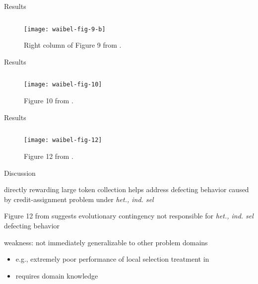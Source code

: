 \begin{frame}{Results}

\begin{figure}
\begin{columns}
\begin{column}{0.7\textwidth}
\texttt{[image: waibel-fig-9-b]}
\end{column}
\begin{column}{0.3\textwidth}
\caption{
Right column of Figure 9 from \cite{waibel2009genetic}.
}
\end{column}
\end{columns}
\end{figure}

\end{frame}

\begin{frame}{Results}


\begin{figure}
\begin{columns}
\begin{column}{0.7\textwidth}
\texttt{[image: waibel-fig-10]}
\end{column}
\begin{column}{0.3\textwidth}
\caption{
Figure 10 from \cite{waibel2009genetic}.
}
\end{column}
\end{columns}
\end{figure}

\end{frame}

\begin{frame}{Results}

\begin{figure}
\begin{columns}
\begin{column}{0.8\textwidth}
\texttt{[image: waibel-fig-12]}
\end{column}
\begin{column}{0.2\textwidth}
\caption{
Figure 12 from \cite{waibel2009genetic}.
}
\end{column}
\end{columns}
\end{figure}

\end{frame}

\begin{frame}{Discussion}

directly rewarding large token collection helps address defecting behavior caused by credit-assignment problem under \textit{het., ind. sel}

Figure 12 from \cite{waibel2009genetic} suggests evolutionary contingency not responsible for \textit{het., ind. sel} defecting behavior

weakness: not immediately generalizable to other problem domains
\begin{itemize}
\item e.g., extremely poor performance of local selection treatment in \cite{knudson2010coevolution}
\item requires domain knowledge
\end{itemize}

\end{frame}
